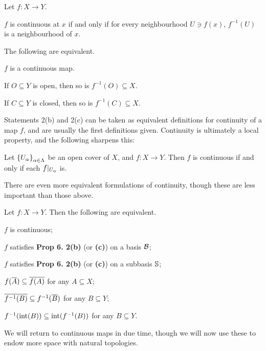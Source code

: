\documentclass[11pt]{article}
\begin{document}
\begin{proposition}
    Let $f : X \to Y$.
    \begin{enum}
        \item $f$ is continuous at $x$ if and only if for every neighbourhood $U \ni f(x)$, $f^{-1}(U)$ is a neighbourhood of $x$.
        \item The following are equivalent.
        \begin{enum2}
            \item $f$ is a continuous map.
            \item If $O \subseteq Y$ is open, then so is $f^{-1}(O) \subseteq X$.
            \item If $C \subseteq Y$ is closed, then so is $f^{-1}(C) \subseteq X$.
        \end{enum2}
    \end{enum}
\end{proposition}
Statements 2(b) and 2(c) can be taken as equivalent definitions for continuity of a map $f$, and are usually the first definitions given. Continuity is ultimately a local property, and the following sharpens this:
\begin{theorem}
    Let $\set{U_\a}_{\a \in \Lambda}$ be an open cover of $X$, and $f : X \to Y$. Then $f$ is continuous if and only if each $f|_{U_\a}$ is.
\end{theorem}
There are even more equivalent formulations of continuity, though these are less important than those above.
\begin{proposition}
    Let $f : X \to Y$. Then the following are equivalent.
    \begin{enum}
        \item $f$ is continuous;
        \item $f$ satisfies \textbf{Prop 6. 2(b)} (or \textbf{(c)}) on a basis $\B$;
        \item $f$ satisfies \textbf{Prop 6. 2(b)} (or \textbf{(c)}) on a subbasis $\S$;
        \item $f(\ol A) \subseteq \ol{f(A)}$ for any $A \subseteq X$;
        \item $\ol{f^{-1}(B)} \subseteq f^{-1}(\ol{B})$ for any $B \subseteq Y$;
        \item $f^{-1}(\interior(B)) \subseteq \interior(f^{-1}(B))$ for any $B \subseteq Y$.
    \end{enum}
\end{proposition}
We will return to continuous maps in due time, though we will now use these to endow more space with natural topologies.
\end{document}
